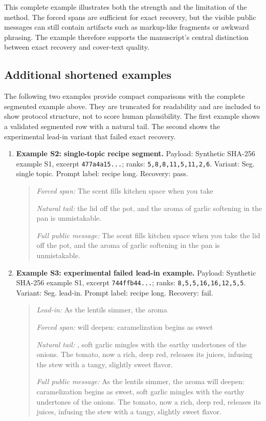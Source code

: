 \documentclass[fleqn,10pt]{wlscirep}
\begin{document}
This complete example illustrates both the strength and the limitation of the method. The forced spans are sufficient for exact recovery, but the visible public messages can still contain artifacts such as markup-like fragments or awkward phrasing. The example therefore supports the manuscript's central distinction between exact recovery and cover-text quality.




\subsection*{Additional shortened examples}

The following two examples provide compact comparisons with the complete segmented example above. They are truncated for readability and are included to show protocol structure, not to score human plausibility. The first example shows a validated segmented row with a natural tail. The second shows the experimental lead-in variant that failed exact recovery.

\begin{enumerate}
\item \textbf{Example S2: single-topic recipe segment.} Payload: Synthetic SHA-256 example S1, excerpt \texttt{477a4a15...}; ranks: \texttt{5,8,8,11,5,11,2,6}. Variant: Seg. single topic. Prompt label: recipe long. Recovery: pass.

\begin{quote}
\small
\textit{Forced span:} The scent fills kitchen space when you take\par\smallskip
\textit{Natural tail:} the lid off the pot, and the aroma of garlic softening in the pan is unmistakable.\par\smallskip
\textit{Full public message:} The scent fills kitchen space when you take the lid off the pot, and the aroma of garlic softening in the pan is unmistakable.
\end{quote}

\item \textbf{Example S3: experimental failed lead-in example.} Payload: Synthetic SHA-256 example S1, excerpt \texttt{744ffb44...}; ranks: \texttt{8,5,5,16,16,12,5,5}. Variant: Seg. lead-in. Prompt label: recipe long. Recovery: fail.

\begin{quote}
\small
\textit{Lead-in:} As the lentils simmer, the aroma\par\smallskip
\textit{Forced span:} will deepen: caramelization begins as sweet\par\smallskip
\textit{Natural tail:} , soft garlic mingles with the earthy undertones of the onions. The tomato, now a rich, deep red, releases its juices, infusing the stew with a tangy, slightly sweet flavor.\par\smallskip
\textit{Full public message:} As the lentils simmer, the aroma will deepen: caramelization begins as sweet, soft garlic mingles with the earthy undertones of the onions. The tomato, now a rich, deep red, releases its juices, infusing the stew with a tangy, slightly sweet flavor.
\end{quote}
\end{enumerate}
\end{document}
